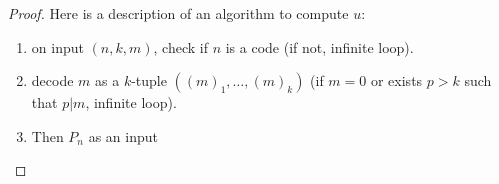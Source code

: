 \documentclass[a4paper]{article}
\begin{document}
\begin{proof}
  Here is a description of an algorithm to compute \(u\):
  \begin{enumerate}
  \item on input \((n, k, m)\), check if \(n\) is a code (if not, infinite loop).
  \item decode \(m\) as a \(k\)-tuple \(((m)_1, \dots, (m)_k)\) (if \(m=0\) or exists \(p>k\) such that \(p|m\), infinite loop).
  \item Then \(P_n\) as an input 
  \end{enumerate}
\end{proof}
\end{document}
